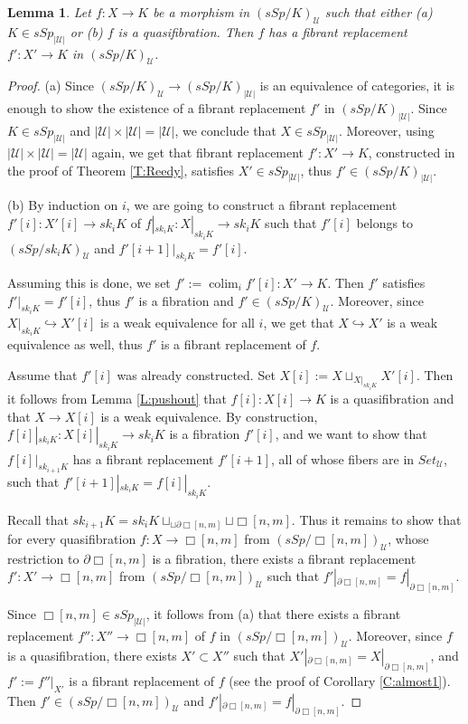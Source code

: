 \documentclass[12pt]{amsart}
\theoremstyle{plain}
\newtheorem{Lem}[Thm]{Lemma}
\theoremstyle{definition}
\numberwithin{equation}{section}
\newcommand{\cal}[1]{\mathcal{#1}}
\newcommand{\C}[1]{\cal#1}
\newcommand{\hra}{\hookrightarrow}
\newcommand{\rl}[1]{Lemma \ref{L:#1}}
\newcommand{\rco}[1]{Corollary \ref{C:#1}}
\newcommand{\rt}[1] {Theorem \ref{T:#1}}
\newcommand{\p}{\partial}
\newcommand{\colim}{\operatorname{colim}}
\begin{document}
\begin{Lem} \label{L:fibrepl}
Let $f:X\to K$ be a morphism in $(sSp/K)_{\C{U}}$ such that either
(a) $K\in sSp_{|\C{U}|}$ or (b) $f$ is a quasifibration. Then $f$
has a fibrant replacement  $f':X'\to K$ in $(sSp/K)_{\C{U}}$.
\end{Lem}

\begin{proof}
(a) Since $(sSp/K)_{\C{U}}\to (sSp/K)_{|\C{U}|}$ is an equivalence
of categories, it is enough to show the existence of a fibrant
replacement $f'$ in $(sSp/K)_{|\C{U}|}$. Since $K\in
sSp_{|\C{U}|}$ and $|\C{U}|\times |\C{U}|=|\C{U}|$, we conclude
that $X\in sSp_{|\C{U}|}$. Moreover, using $|\C{U}|\times
|\C{U}|=|\C{U}|$ again, we get that fibrant replacement $f':X'\to
K$, constructed in the proof of \rt{Reedy}, satisfies $X'\in
sSp_{|\C{U}|}$, thus $f'\in (sSp/K)_{|\C{U}|}$.

(b) By induction on $i$, we are going to construct a fibrant
replacement $f'[i]:X'[i]\to sk_i K$ of $f|_{sk_i K}:X|_{sk_i K}\to
sk_i K$ such that $f'[i]$ belongs to $(sSp/sk_i K)_{\C{U}}$ and
$f'[i+1]|_{sk_i K}=f'[i]$.

Assuming this is done, we set $f':=\colim_i f'[i]:X'\to K$. Then
$f'$ satisfies $f'|_{sk_i K}=f'[i]$, thus $f'$ is a fibration and
$f'\in (sSp/K)_{\C{U}}$. Moreover, since $X|_{sk_i K}\hra X'[i]$
is a weak equivalence for all $i$, we get that $X\hra X'$ is a
weak equivalence as well, thus $f'$ is a fibrant replacement of
$f$.

Assume that $f'[i]$ was already constructed. Set
$X[i]:=X\sqcup_{X|_{sk_i K}}X'[i]$. Then it follows from
\rl{pushout} that $f[i]:X[i]\to K$ is a quasifibration and that
$X\to X[i]$ is a weak equivalence. By construction,  $f[i]|_{sk_i
K}:X[i]|_{sk_i K}\to sk_i K$ is a fibration $f'[i]$, and we want
to show that $f[i]|_{sk_{i+1} K}$ has a fibrant replacement
$f'[i+1]$, all of whose fibers are in $Set_{\C{U}}$, such that
$f'[i+1]|_{sk_i K}=f[i]|_{sk_i K}$.

Recall that $sk_{i+1} K=sk_i K\sqcup_{\sqcup {\p\Box[n,m]}}{\sqcup
{\Box[n,m]}}$. Thus it remains to show that for every quasifibration 
$f:X\to\Box[n,m]$ from $(sSp/\Box[n,m])_{\C{U}}$, whose restriction to $\p\Box[n,m]$
is a fibration, there exists a fibrant replacement
$f':X'\to\Box[n,m]$ from $(sSp/\Box[n,m])_{\C{U}}$ such that
$f'|_{\p\Box[n,m]}=f|_{\p\Box[n,m]}$.

Since $\Box[n,m]\in sSp_{|\C{U}|}$, it follows from (a) that there
exists a fibrant replacement $f'':X''\to\Box[n,m]$ of $f$ in
$(sSp/\Box[n,m])_{\C{U}}$. Moreover, since $f$ is a
quasifibration, there exists $X'\subset X''$ such that
$X'|_{\p\Box[n,m]}=X|_{\p\Box[n,m]}$, and $f':=f''|_{X'}$ is a
fibrant replacement of $f$ (see the proof of \rco{almost1}). Then
 $f'\in (sSp/\Box[n,m])_{\C{U}}$ and $f'|_{\p\Box[n,m]}=f|_{\p\Box[n,m]}$.
\end{proof}
\end{document}

